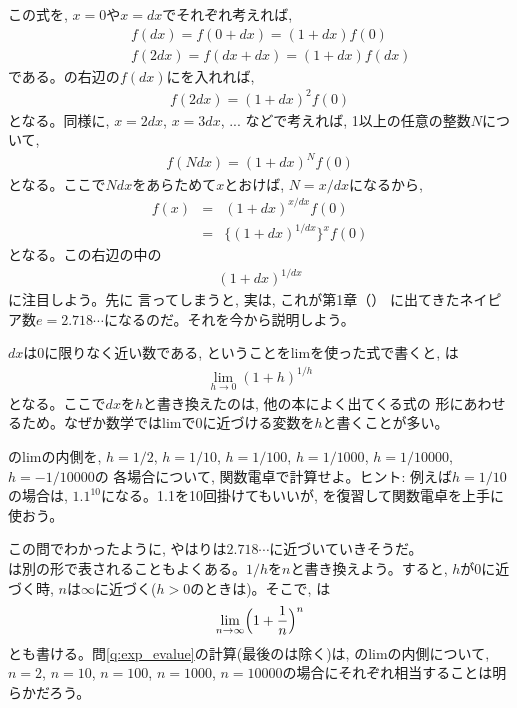 この式を, $x=0$や$x=dx$でそれぞれ考えれば, 
\begin{eqnarray}
&&f(dx)=f(0+dx)= (1+dx) f(0)\label{eq:expexplain3}\\
&&f(2dx)=f(dx+dx)= (1+dx) f(dx)\label{eq:expexplain4}\end{eqnarray}
である。の右辺の$f(dx)$にを入れれば, 
\begin{eqnarray}
f(2dx)= (1+dx)^2 f(0)\label{eq:expexplain42}
\end{eqnarray}
となる。同様に, $x=2dx$, $x=3dx$, ... などで考えれば, 1以上の任意の整数$N$について, 
\begin{eqnarray}
f(Ndx)= (1+dx)^N f(0)\label{eq:expexplain44}
\end{eqnarray}
となる。ここで$Ndx$をあらためて$x$とおけば, $N=x/dx$になるから, 
\begin{eqnarray}
f(x)&=& (1+dx)^{x/dx} f(0)\nonumber\\
    &=& \{(1+dx)^{1/dx}\}^x f(0)
\label{eq:expexplain6}
\end{eqnarray}
となる。この右辺の中の
\begin{eqnarray}
(1+dx)^{1/dx}\label{eq:Napier01}
\end{eqnarray}
に注目しよう。先に
言ってしまうと, 実は, これが第1章（）
に出てきたネイピア数$e=2.718\cdots$になるのだ。それを今から説明しよう。

$dx$は0に限りなく近い数である, ということをlimを使った式で書くと, は
\begin{eqnarray}
\lim_{h \to 0} (1+h)^{1/h}\label{eq:def_NapierNum_h}
\end{eqnarray}
となる。ここで$dx$を$h$と書き換えたのは, 他の本によく出てくる式の
形にあわせるため。なぜか数学ではlimで$0$に近づける変数を$h$と書くことが多い。

\begin{q}\label{q:exp_evalue} のlimの内側を, 
$h=1/2$, $h=1/10$, $h=1/100$, $h=1/1000$, $h=1/10000$, $h=-1/10000$の
各場合について, 関数電卓で計算せよ。ヒント: 例えば$h=1/10$の場合は, 
$1.1^{10}$になる。1.1を10回掛けてもいいが, 
を復習して関数電卓を上手に使おう。
\end{q}

この問でわかったように, やはりは$2.718\cdots$に近づいていきそうだ。\\

は別の形で表されることもよくある。$1/h$を$n$と書き換えよう。すると, 
$h$が0に近づく時, $n$は$\infty$に近づく($h>0$のときは)。そこで, は
\begin{eqnarray}
\lim_{n \to \infty} \Bigl( 1 + \frac{1}{n} \Bigr)^n\label{eq:def_NapierNum}
\end{eqnarray}
とも書ける。問\ref{q:exp_evalue}の計算(最後のは除く)は, 
のlimの内側について, $n=2$, $n=10$, 
$n=100$, $n=1000$, $n=10000$の場合にそれぞれ相当することは明らかだろう。

